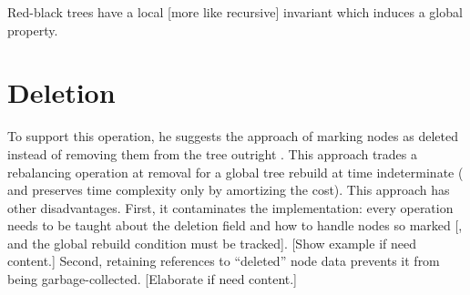 \documentclass[preprint]{sigplanconf}
\begin{document}
Red-black trees have a local [more like recursive] invariant which induces a global property.

\section{Deletion}

To support this operation, he suggests the approach of marking nodes as deleted instead of removing them from the tree outright \cite[p. 50]{okasaki1996purely}. This approach trades a rebalancing operation at removal for a global tree rebuild at time indeterminate ( and preserves time complexity only by amortizing the cost). This approach has other disadvantages. First, it contaminates the implementation: every operation needs to be taught about the deletion field and how to handle nodes so marked [, and the global rebuild condition must be tracked]. [Show example if need content.] Second, retaining references to ``deleted'' node data prevents it from being garbage-collected. [Elaborate if need content.]
\end{document}
